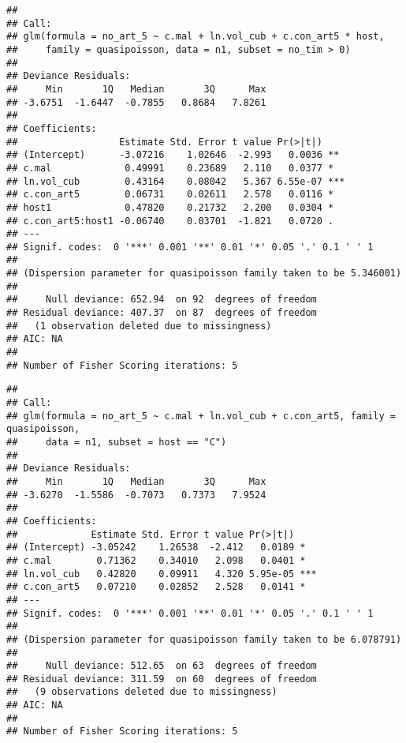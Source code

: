 \documentclass[]{article}
\newenvironment{Shaded}{\begin{snugshade}}{\end{snugshade}}
\newcommand{\KeywordTok}[1]{\textcolor[rgb]{0.13,0.29,0.53}{\textbf{#1}}}
\newcommand{\DataTypeTok}[1]{\textcolor[rgb]{0.13,0.29,0.53}{#1}}
\newcommand{\DecValTok}[1]{\textcolor[rgb]{0.00,0.00,0.81}{#1}}
\newcommand{\StringTok}[1]{\textcolor[rgb]{0.31,0.60,0.02}{#1}}
\newcommand{\CommentTok}[1]{\textcolor[rgb]{0.56,0.35,0.01}{\textit{#1}}}
\newcommand{\OperatorTok}[1]{\textcolor[rgb]{0.81,0.36,0.00}{\textbf{#1}}}
\newcommand{\NormalTok}[1]{#1}
\begin{document}
\begin{verbatim}
## 
## Call:
## glm(formula = no_art_5 ~ c.mal + ln.vol_cub + c.con_art5 * host, 
##     family = quasipoisson, data = n1, subset = no_tim > 0)
## 
## Deviance Residuals: 
##     Min       1Q   Median       3Q      Max  
## -3.6751  -1.6447  -0.7855   0.8684   7.8261  
## 
## Coefficients:
##                  Estimate Std. Error t value Pr(>|t|)    
## (Intercept)      -3.07216    1.02646  -2.993   0.0036 ** 
## c.mal             0.49991    0.23689   2.110   0.0377 *  
## ln.vol_cub        0.43164    0.08042   5.367 6.55e-07 ***
## c.con_art5        0.06731    0.02611   2.578   0.0116 *  
## host1             0.47820    0.21732   2.200   0.0304 *  
## c.con_art5:host1 -0.06740    0.03701  -1.821   0.0720 .  
## ---
## Signif. codes:  0 '***' 0.001 '**' 0.01 '*' 0.05 '.' 0.1 ' ' 1
## 
## (Dispersion parameter for quasipoisson family taken to be 5.346001)
## 
##     Null deviance: 652.94  on 92  degrees of freedom
## Residual deviance: 407.37  on 87  degrees of freedom
##   (1 observation deleted due to missingness)
## AIC: NA
## 
## Number of Fisher Scoring iterations: 5
\end{verbatim}

\begin{Shaded}
\end{Shaded}

\begin{verbatim}
## 
## Call:
## glm(formula = no_art_5 ~ c.mal + ln.vol_cub + c.con_art5, family = quasipoisson, 
##     data = n1, subset = host == "C")
## 
## Deviance Residuals: 
##     Min       1Q   Median       3Q      Max  
## -3.6270  -1.5586  -0.7073   0.7373   7.9524  
## 
## Coefficients:
##             Estimate Std. Error t value Pr(>|t|)    
## (Intercept) -3.05242    1.26538  -2.412   0.0189 *  
## c.mal        0.71362    0.34010   2.098   0.0401 *  
## ln.vol_cub   0.42820    0.09911   4.320 5.95e-05 ***
## c.con_art5   0.07210    0.02852   2.528   0.0141 *  
## ---
## Signif. codes:  0 '***' 0.001 '**' 0.01 '*' 0.05 '.' 0.1 ' ' 1
## 
## (Dispersion parameter for quasipoisson family taken to be 6.078791)
## 
##     Null deviance: 512.65  on 63  degrees of freedom
## Residual deviance: 311.59  on 60  degrees of freedom
##   (9 observations deleted due to missingness)
## AIC: NA
## 
## Number of Fisher Scoring iterations: 5
\end{verbatim}
\end{document}
